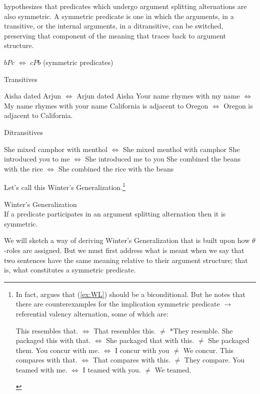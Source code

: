 \documentclass[twoside, 12pt]{article}
\begin{document}
\citet{Winter:2018} hypothesizes that predicates which undergo argument splitting alternations are also symmetric. A symmetric predicate is one in which the arguments, in a transitive, or the internal arguments, in a ditransitive, can be switched, preserving that component of the meaning that traces back to argument structure.
\begin{exe}
\raggedright
  \ex \label{ex:symm} $bPc$ $\Leftrightarrow$ $cPb$ (symmetric predicates)
  \begin{xlist}
  \ex \label{ex:symmtrans} Transitives
  \begin{xlist}
    \ex Aisha dated Arjun $\Leftrightarrow$ Arjun dated Aisha
    \ex Your name rhymes with my name $\Leftrightarrow$ My name rhymes with your name
    \ex California is adjacent to Oregon $\Leftrightarrow$ Oregon is adjacent to California.
  \end{xlist}
  \ex Ditransitives
  \begin{xlist}
    \ex She mixed camphor with menthol $\Leftrightarrow$ She mixed menthol with camphor 
    \ex She introduced you to me $\Leftrightarrow$ She introduced me to you
    \ex She combined the beans with the rice $\Leftrightarrow$ She combined the rice with the beans
  \end{xlist}
\end{xlist}
\end{exe}
Let's call this Winter's Generalization.\footnote{In fact, \citet{Winter:2018} argues that (\ref{ex:WL}) should be a biconditional. But he notes that there are counterexamples for the implication symmetric predicate $\rightarrow$ referential valency alternation, some of which are:
\begin{exe}
\raggedright
  \begin{xlist}
    \ex This resembles that. $\Leftrightarrow$ That resembles this. $\neq$ *They resemble.
    \ex She packaged this with that. $\Leftrightarrow$ She packaged that with this. $\neq$ She packaged them.
    \ex You concur with me. $\Leftrightarrow$ I concur with you $\neq$ We concur.
    \ex This compares with that. $\Leftrightarrow$ That compares with this. $\neq$ They compare.
    \ex You teamed with me. $\Leftrightarrow$ I teamed with you. $\neq$ We teamed.
  \end{xlist}
\end{exe}}
\begin{exe}
\raggedright
  \ex \label{ex:WL} Winter's Generalization\\
  If a predicate participates in an argument splitting alternation then it is symmetric.
\end{exe}
We will sketch a way of deriving Winter's Generalization that is built upon how $\theta$-roles are assigned. But we must first address what is meant when we say that two sentences have the same meaning relative to their argument structure; that is, what constitutes a symmetric predicate.
\end{document}
